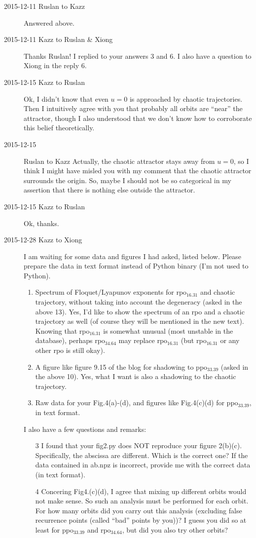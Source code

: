 \begin{description}
\item[2015-12-11 Ruslan to Kazz]
Answered above.

\item[2015-12-11 Kazz to Ruslan \& Xiong]
Thanks Ruslan! I replied to your answers 3 and 6. I also have a question to Xiong in the reply 6.

\item[2015-12-15 Kazz to Ruslan]
Ok, I didn't know that even $u=0$ is approached by chaotic trajectories. Then I intuitively agree with you that probably all orbits are ``near'' the attractor, though I also understood that we don't know how to corroborate this belief theoretically.

\item[2015-12-15] Ruslan to Kazz
Actually, the chaotic attractor stays away from $u=0$, so I think I might have misled you with my comment that the chaotic attractor surrounds the origin.  So, maybe I should not be so categorical in my assertion that there is nothing else outside the attractor.

\item[2015-12-15 Kazz to Ruslan]
Ok, thanks.

\item[2015-12-28 Kazz to Xiong]
I am waiting for some data and figures I had asked, listed below.
Please prepare the data in text format instead of Python binary
 (I'm not used to Python).
\begin{enumerate}
\item
Spectrum of Floquet/Lyapunov exponents for rpo$_{16.31}$ and chaotic trajectory, without taking into account the degeneracy (asked in the above 13). Yes, I'd like to show the spectrum of an rpo and a chaotic trajectory as well (of course they will be mentioned in the new text). Knowing that rpo$_{16.31}$ is somewhat unusual (most unstable in the database), perhaps rpo$_{34.64}$ may replace rpo$_{16.31}$ (but rpo$_{16.31}$ or any other rpo is still okay).
\item
A figure like figure 9.15 of the blog for shadowing to ppo$_{33.39}$ (asked in the above 10). Yes, what I want is also a shadowing to the chaotic trajectory.
\item
Raw data for your Fig.4(a)-(d), and figures like Fig.4(c)(d) for ppo$_{33.39}$, in text format.
\end{enumerate}
I also have a few questions and remarks:
\begin{enumerate}
\item[3]
I found that your fig2.py does NOT reproduce your figure 2(b)(c).
Specifically, the abscissa are different.
Which is the correct one?
If the data contained in ab.npz is incorrect, provide me with the correct data
 (in text format).
\item[4]
Concering Fig4.(c)(d), I agree that mixing up different orbits would not make sense. So such an analysis must be performed for each orbit. For how many orbits did you carry out this analysis (excluding false recurrence points (called ``bad'' points by you))? I guess you did so at least for ppo$_{33.39}$ and rpo$_{34.64}$, but did you also try other orbits?
\end{enumerate}


\end{description}
